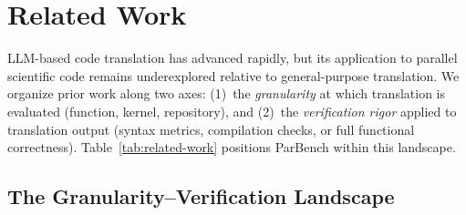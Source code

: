 \documentclass[conference]{IEEEtran}
\begin{document}
\section{Related Work}
\label{sec:related-work}

LLM-based code translation has advanced rapidly, but its application to parallel scientific code remains underexplored relative to general-purpose translation. We organize prior work along two axes: (1)~the \emph{granularity} at which translation is evaluated (function, kernel, repository), and (2)~the \emph{verification rigor} applied to translation output (syntax metrics, compilation checks, or full functional correctness). Table~\ref{tab:related-work} positions ParBench within this landscape.

\subsection{The Granularity--Verification Landscape}
\label{sec:granularity-verification}
\end{document}
